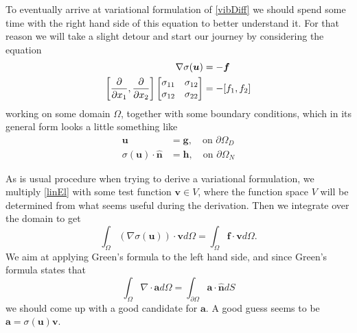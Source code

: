 \documentclass[paper=a4, fontsize=11pt]{scrartcl} %
\begin{document}
To eventually arrive at variational formulation of \ref{vibDiff} we should spend some time with the right hand side of this equation to better understand it. For that reason we will take a slight detour and start our journey by considering the equation
\begin{align}
\label{linEl}
\nabla \sigma(\boldsymbol{u}) &= - \boldsymbol{f} \\
\left[\frac{\partial}{\partial x_1},  \frac{\partial}{\partial x_2}\right]\begin{bmatrix}
\sigma_{11} & \sigma_{12} \\
\sigma_{12} & \sigma_{22}
\end{bmatrix} &= -[f_1,f_2] \notag
\end{align}
working on some domain $\Omega$,
together with some boundary conditions, which in its general form looks a little something like
\begin{align*}
\boldsymbol{u} &= \boldsymbol{g}, \quad \text{on } \partial \Omega_D \\
\sigma(\boldsymbol{u})\cdot \boldsymbol{\hat{n}} &= \boldsymbol{h}, \quad \text{on } \partial \Omega_N
\end{align*}

As is usual procedure when trying to derive a variational formulation, we multiply \ref{linEl} with some test function $\boldsymbol{v}\in V$, where the function space $V$ will be determined from what seems useful during the derivation. Then we integrate over the domain to get
\begin{equation}
\label{step1}
\int_{\Omega} (\nabla \sigma(\boldsymbol{u}))\cdot \boldsymbol{v}d\Omega = \int_{\Omega}\boldsymbol{f}\cdot \boldsymbol{v} d\Omega .
\end{equation}
We aim at applying Green's formula to the left hand side, and since Green's formula states that
\begin{equation*}
\int_{\Omega}\nabla \cdot \boldsymbol{a}d\Omega = \int_{\partial \Omega} \boldsymbol{a}\cdot \boldsymbol{\hat{n}}dS 
\end{equation*}
we should come up with a good candidate for $\boldsymbol{a}$. A good guess seems to be $\boldsymbol{a} = \sigma(\boldsymbol{u})\boldsymbol{v}$.
\end{document}
